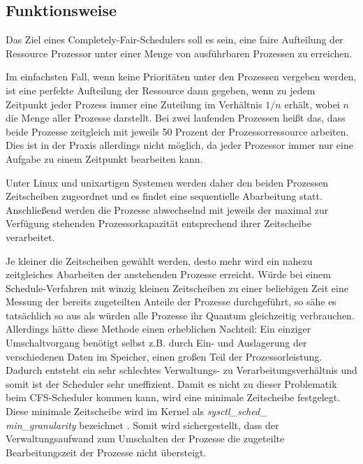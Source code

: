 \subsection{Funktionsweise}\label{s:cfs_fktweise}


Das Ziel eines  Completely-Fair-Schedulers{} soll es sein, eine faire Aufteilung der Ressource Prozessor unter einer Menge von ausführbaren Prozessen zu erreichen.


Im einfachsten Fall, wenn keine Prioritäten unter den Prozessen vergeben werden, ist eine perfekte Aufteilung der Ressource dann gegeben, wenn zu jedem Zeitpunkt jeder Prozess immer eine Zuteilung im Verhältnis $1/n$ erhält, wobei $n$ die Menge aller Prozesse darstellt.
Bei zwei laufenden Prozessen heißt das, dass beide Prozesse zeitgleich mit jeweils 50 Prozent der Prozessorressource arbeiten. Dies ist in der Praxis allerdings nicht möglich, da jeder Prozessor immer nur eine Aufgabe zu einem Zeitpunkt bearbeiten kann.

Unter Linux und unix\-artigen Systemen werden daher den beiden Prozessen Zeitscheiben zugeordnet und es findet eine sequentielle Abarbeitung statt. Anschließend werden die Prozesse abwechselnd mit jeweils der maximal zur Ver\-fügung stehenden Prozessorkapazität entsprechend ihrer Zeitscheibe verarbeitet.

Je kleiner die Zeitscheiben gewählt werden, desto mehr wird ein nahezu zeitgleiches Abarbeiten der anstehenden Prozesse erreicht.
Würde bei einem Schedule-Verfahren mit winzig kleinen Zeitscheiben zu einer beliebigen Zeit eine Messung der bereits zugeteilten Anteile der Prozesse durchgeführt, so sähe es tatsächlich so aus als wür\-den alle Prozesse ihr Quantum gleichzeitig verbrauchen.
Allerdings hätte diese Methode einen erheblichen Nachteil: Ein einziger Umschalt\-vorgang be\-nötigt selbst z.B. durch Ein- und Auslagerung der verschiedenen Daten im Speicher, einen großen Teil der Prozessorleistung. Dadurch entsteht ein sehr schlechtes Verwaltungs- zu Verarbeitungs\-verhält\-nis und somit ist der Scheduler sehr uneffizient. Damit es nicht zu dieser Problematik beim CFS-Scheduler kommen kann, wird eine minimale Zeitscheibe festgelegt. Diese minimale Zeitscheibe wird im Kernel als \textit{sysctl\_sched\_\\min\_granu\-larity} bezeichnet \cite{paperfairness}.
Somit wird sichergestellt, dass der Verwaltungsaufwand zum Umschalten der Prozesse die zugeteilte Bearbeitungszeit der Prozesse nicht übersteigt.


